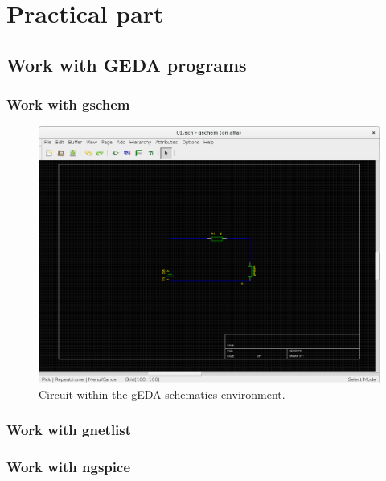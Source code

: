 \documentclass{report}
\begin{document}
\newpage
\chapter{Practical part}

\section{Work with GEDA programs}
\subsection{Work with gschem}


\begin{figure}[!ht]
\centering
\includegraphics[width=.83\linewidth]{gschem}
\caption{Circuit within the gEDA schematics environment.}
\end{figure}
\vspace*{\floatsep}


\newpage
\subsection{Work with gnetlist}

\newpage

\subsection{Work with ngspice}
\end{document}
